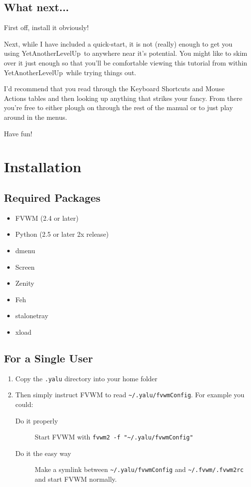 \documentclass[a4paper,11pt]{article}
\newcommand{\yalu}{YetAnotherLevelUp}
\begin{document}
		\subsection{What next...}
			First off, install it obviously!
			
			Next, while I have included a quick-start, it is not (really) enough to
			get you using \yalu\ to anywhere near it's potential. You might like to
			skim over it just enough so that you'll be comfortable viewing this
			tutorial from within \yalu\ while trying things out.
			
			I'd recommend that you read through the Keyboard Shortcuts and Mouse
			Actions tables and then looking up anything that strikes your fancy. From
			there you're free to either plough on through the rest of the manual or to
			just play around in the menus.
			
			Have fun!
	
	\section{Installation}
		\subsection{Required Packages}
			\begin{itemize}
				\item FVWM (2.4 or later)
				\item Python (2.5 or later 2x release)
				\item dmenu
				\item Screen
				\item Zenity
				\item Feh
				\item stalonetray
				\item xload
			\end{itemize}
		
		\subsection{For a Single User}
			\begin{enumerate}
				\item Copy the \texttt{.yalu} directory into your home folder
				\item Then simply instruct FVWM to read \texttt{\textasciitilde/.yalu/fvwmConfig}. For
					example you could:
					\begin{description}
						\item[Do it properly\texttrademark] Start FVWM with
							\texttt{fvwm2 -f "\textasciitilde/.yalu/fvwmConfig"}
						\item[Do it the easy way] Make a symlink between
							\texttt{\textasciitilde/.yalu/fvwmConfig} and
							\texttt{\textasciitilde/.fvwm/.fvwm2rc} and start FVWM normally.
					\end{description}
			\end{enumerate}
\end{document}
